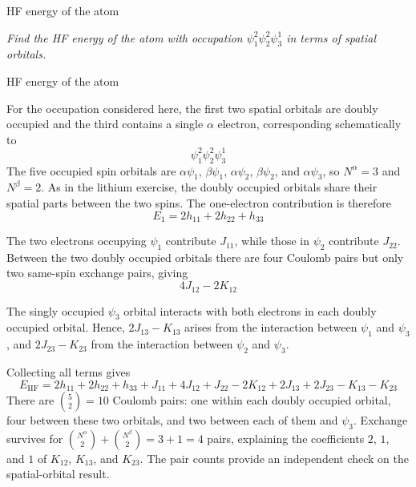 \documentclass[11pt,a4paper,titlepage]{article}
\numberwithin{equation}{section}
\newcommand{\violet}[1]{\textcolor{hfViolet}{#1}}
\begin{document}
\begin{hfexercise}{HF energy of the  atom}

\violet{\textit{Find the HF energy of the \ce{B} atom with occupation
$\psi_1^2\psi_2^2\psi_3^1$ in terms of spatial orbitals.}}

\end{hfexercise}
\begin{hfsolution}{HF energy of the  atom}

For the occupation considered here, the first two spatial orbitals are
doubly occupied and the third contains a single $\alpha$ electron,
corresponding schematically to
\begin{equation}
  \psi_1^2\psi_2^2\psi_3^1
\end{equation}
The five occupied spin orbitals are $\alpha\psi_1$, $\beta\psi_1$,
$\alpha\psi_2$, $\beta\psi_2$, and $\alpha\psi_3$, so
$N^\alpha=3$ and $N^\beta=2$. As in the lithium exercise, the doubly
occupied orbitals share their spatial parts between the two spins.
The one-electron contribution is therefore
\begin{equation}
  E_1
  =
  2h_{11}
  +
  2h_{22}
  +
  h_{33}
\end{equation}

The two electrons occupying $\psi_1$ contribute $J_{11}$, while those in
$\psi_2$ contribute $J_{22}$. Between the two doubly occupied orbitals there
are four Coulomb pairs but only two same-spin exchange pairs, giving
\begin{equation}
  4J_{12}-2K_{12}
\end{equation}

The singly occupied $\psi_3$ orbital interacts with both electrons in each
doubly occupied orbital. Hence,
  $2J_{13}-K_{13}$
arises from the interaction between $\psi_1$ and $\psi_3$, and
  $2J_{23}-K_{23}$
from the interaction between $\psi_2$ and $\psi_3$.

Collecting all terms gives
\begin{equation}
    E_\text{HF}
    =
    2h_{11}
    +
    2h_{22}
    +
    h_{33}
    +
    J_{11}
    +
    4J_{12}
    +
    J_{22}
    -
    2K_{12}
    +
    2J_{13}
    +
    2J_{23}
    -
    K_{13}
    -
    K_{23}
\end{equation}
There are $\binom{5}{2}=10$ Coulomb pairs: one within each doubly
occupied orbital, four between these two orbitals, and two between each
of them and $\psi_3$. Exchange survives for
$\binom{N^\alpha}{2}+\binom{N^\beta}{2}=3+1=4$ pairs, explaining
the coefficients $2$, $1$, and $1$ of $K_{12}$, $K_{13}$, and $K_{23}$.
The pair counts provide an independent check on the spatial-orbital result.

\end{hfsolution}
\end{document}
